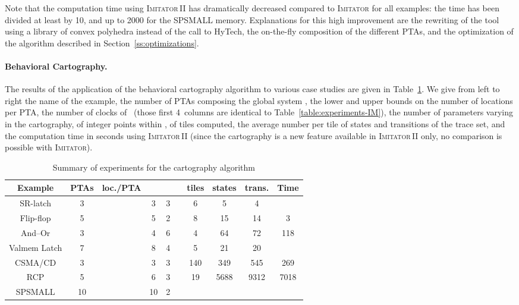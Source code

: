 \documentclass[submission,copyright,creativecommons]{eptcs}
\newcommand{\hytech}{{\sc HyTech}}
\newcommand{\imitator}{\textsc{Imitator}}
\newcommand{\imitatordeux}{\textsc{Imitator}\,II}
\newcommand{\paragraphe}[1]{\paragraph{#1.}}
\begin{document}
Note that the computation time using \imitatordeux{} has dramatically decreased compared to \imitator{} for all examples: the time has been divided at least by 10, and up to 2000 for the SPSMALL memory.
Explanations for this high improvement are the rewriting of the tool using a library of convex polyhedra instead of the call to \hytech{}, the on-the-fly composition of the different PTAs, and the optimization of the algorithm described in Section~\ref{ss:optimizations}.



\paragraphe{Behavioral Cartography}
The results of the application of the behavioral cartography algorithm to various case studies are given in Table~\ref{table:experiments-BC}.
We give from left to right the name of the example,
the number of PTAs composing the global system ,
the lower and upper bounds on the number of locations per PTA,
the number of clocks of~ (those first 4~columns are identical to Table~\ref{table:experiments-IM}),
the number of parameters varying in the cartography,
of integer points within ,
of tiles computed,
the average number per tile of states and transitions of the trace set,
and the computation time in seconds using \imitatordeux{} (since the cartography is a new feature available in \imitatordeux{} only, no comparison is possible with \imitator{}).


\begin{table}[ht!]

\centering

\small

\begin{tabular}{|@{\,}c@{\,}||@{\,}c@{\,}|@{\,}c@{\,}|@{\,}c@{\,}|@{\,}c@{\,}|@{\,}c@{\,}||@{\,}c@{\,}|@{\,}c@{\,} | @{\,}c@{\,} ||@{\,}c@{\,}|}
 \hline
   Example & PTAs & loc./PTA &   &  &  & tiles & states & trans. & Time \\
 \hline
   SR-latch & 3 &  & 3 & 3 &  & 6 & 5 & 4 &  \\
 \hline
   Flip-flop \cite{cc07} & 5 &  & 5 & 2 &  & 8 & 15 & 14 & 3 \\
 \hline
   And--Or \cite{cc05} & 3 &  & 4 & 6 &  & 4 & 64 & 72 & 118 \\
 \hline
   Valmem Latch & 7 &  & 8 & 4 &  & 5 & 21 & 20 &  \\
 \hline
CSMA/CD \cite{knsw07} & 3 &  & 3 & 3 &  & 140 & 349 & 545 & 269 \\
 \hline
   RCP \cite{kns03} & 5 &  & 6 & 3 &  & 19 & 5688 & 9312 & 7018 \\
 \hline
   SPSMALL \cite{cefx09} & 10 &  & 10 & 2 &  &  &  &  &  \\
\hline
\end{tabular}

\caption{Summary of experiments for the cartography algorithm}
\label{table:experiments-BC}
\end{table}
\end{document}
